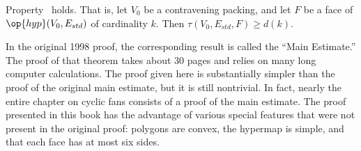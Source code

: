 %






\begin{lemma}\label{lemma:main} %
Property~ holds.  That is,
let $V_0$ be a contravening packing, and  let $F$ be a
face of $\op{hyp}(V_0,E_{std})$ of cardinality $k$.  Then
$\tau(V_0,E_{std},F) \ge d(k)$.
\end{lemma}
%
%


\begin{remark}
  In the original 1998 proof, the corresponding result is called the
  ``Main Estimate.''  The proof of that theorem takes about 30 pages
  and relies on many long computer calculations.  The proof given here
  is substantially simpler than the proof of the original main
  estimate, but it is still nontrivial. In fact, nearly the entire
  chapter on cyclic fans consists of a proof of the main estimate.
  The proof presented in this book has the advantage of various
  special features that were not present in the original proof:
  polygons are convex, the hypermap is simple, and that each face has
  at most six sides.
\end{remark}




